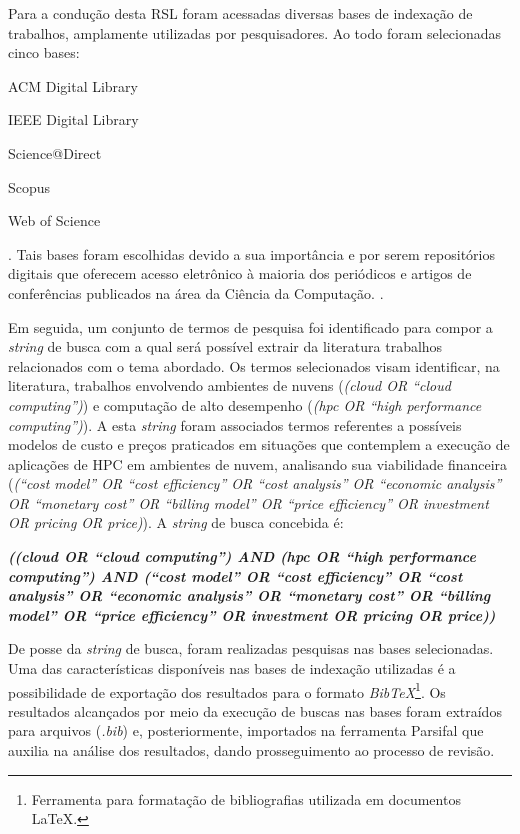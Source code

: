 \documentclass[tese,capa]{texufpel}
\begin{document}
Para a condução desta RSL foram acessadas diversas bases de indexação de trabalhos, amplamente utilizadas por pesquisadores. Ao todo foram selecionadas cinco bases:
\begin{enumerate*}[label=\textit{\roman*}),itemjoin={{; }},itemjoin*={{; e }}]
  \item ACM Digital Library
  \item IEEE Digital Library
  \item Science@Direct
  \item Scopus
  \item Web of Science
\end{enumerate*}. Tais bases foram escolhidas devido a sua importância e por serem repositórios digitais que oferecem acesso eletrônico à maioria dos periódicos e artigos de conferências publicados na área da Ciência da Computação. \cite{okoliGuideConductingSystematic2010}.

Em seguida, um conjunto de termos de pesquisa foi identificado para compor a \emph{string} de busca com a qual será possível extrair da literatura trabalhos relacionados com o tema abordado. Os termos selecionados visam identificar, na literatura, trabalhos envolvendo ambientes de nuvens (\emph{(cloud OR ``cloud computing'')}) e computação de alto desempenho (\emph{(hpc OR ``high performance computing'')}). A esta \emph{string} foram associados termos referentes a possíveis modelos de custo e preços praticados em situações que contemplem a execução de aplicações de HPC em ambientes de nuvem, analisando sua viabilidade financeira (\emph{(``cost model'' OR ``cost efficiency'' OR ``cost analysis'' OR ``economic analysis'' OR ``monetary cost'' OR ``billing model'' OR ``price efficiency'' OR investment OR pricing OR price)}). A \emph{string} de busca concebida é:

\vspace{3mm}
\begin{center}
	\begin{minipage}{12.5cm}
		\textit{\textbf{((cloud OR ``cloud computing'') AND (hpc OR ``high performance computing'') AND (``cost model'' OR ``cost efficiency'' OR ``cost analysis'' OR ``economic analysis'' OR ``monetary cost'' OR ``billing model'' OR ``price efficiency'' OR investment OR pricing OR price))}}
	\end{minipage}
\end{center}
\vspace{3mm}

De posse da \emph{string} de busca, foram realizadas pesquisas nas bases selecionadas. Uma das características disponíveis nas bases de indexação utilizadas é a possibilidade de exportação dos resultados para o formato \emph{BibTeX}\footnote{Ferramenta para formatação de bibliografias utilizada em documentos \LaTeX.}. Os resultados alcançados por meio da execução de buscas nas bases foram extraídos para arquivos (\emph{.bib}) e, posteriormente, importados na ferramenta Parsifal \cite{Parsifal2014} que auxilia na análise dos resultados, dando prosseguimento ao processo de revisão.
\end{document}

